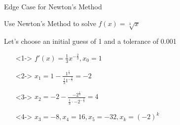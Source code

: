 \documentclass[aspectratio=169,xcolor=dvipsnames]{beamer}
\begin{document}

\begin{frame}{Edge Case for Newton's Method}
    \begin{center}
        Use Newton's Method to solve $f(x) = \sqrt[3]{x}$
    \end{center}
    Let's choose an initial guess of 1 and a tolerance of 0.001
    \begin{itemize}
        \centering
        \item[]<1->
        $f'(x) = \frac{1}{3}x^{-\frac{2}{3}}, x_0 = 1$ \\
        \item[]<2->
        $x_1 = 1 - \frac{1^{\frac{1}{3}}}{\frac{1}{3}1^{-\frac{2}{3}}} = -2$
        \item[]<3->
        $x_2 = -2 - \frac{-2^{\frac{1}{3}}}{\frac{1}{3} \cdot -2^{-\frac{2}{3}}} = 4$
        \item[]<4->
        $x_3 = -8, x_4 = 16, x_5 = -32, x_k = (-2)^k$ \\ \vspace{0.3 cm}
    \end{itemize}
    \begin{center}
    \end{center}
\end{frame}

\end{document}
